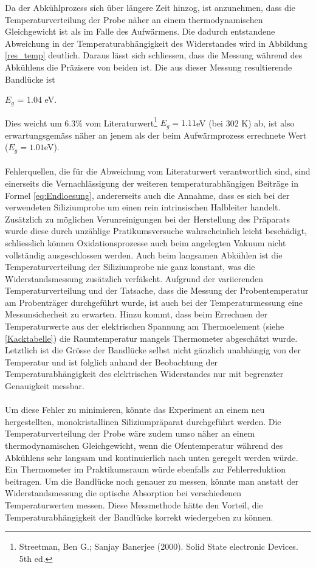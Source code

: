 \documentclass[a4paper,parskip,11pt, DIV12]{scrreprt}
\begin{document}
Da der Abkühlprozess sich über längere Zeit hinzog, ist anzunehmen, dass die Temperaturverteilung der Probe näher an einem thermodynamischen Gleichgewicht ist als im Falle des Aufwärmens. Die dadurch entstandene Abweichung in der Temperaturabhängigkeit des Widerstandes wird in Abbildung
\ref{res_temp} deutlich. Daraus lässt sich schliessen, dass die Messung während des Abkühlens die Präzisere von beiden ist. Die aus dieser Messung resultierende Bandlücke ist \begin{center}
$E_g$ = 1.04 eV.
\end{center} Dies weicht um 6.3\% vom Literaturwert\footnote{Streetman, Ben G.; Sanjay Banerjee (2000). Solid State electronic Devices. 5th ed.} $E_g = 1.11$eV (bei 302 K) ab, ist also erwartungsgemäss näher an jenem als der beim Aufwärmprozess errechnete Wert ($E_g = 1.01$eV). \\
\\
Fehlerquellen, die für die Abweichung vom Literaturwert verantwortlich sind, sind einerseits die Vernachlässigung der weiteren temperaturabhängigen Beiträge in Formel \ref{eq:Endloesung}, andererseits auch die Annahme, dass es sich bei der verwendeten Siliziumprobe um einen rein intrinsischen Halbleiter handelt. Zusätzlich zu möglichen Verunreinigungen bei der Herstellung des Präparats wurde diese durch unzählige Pratikumsversuche wahrscheinlich leicht beschädigt, schliesslich können Oxidationsprozesse auch beim angelegten Vakuum nicht vollständig ausgeschlossen werden. Auch beim langsamen Abkühlen ist die Temperaturverteilung der Siliziumprobe nie ganz konstant, was die Widerstandsmessung zusätzlich verfälscht. Aufgrund der variierenden Temperaturverteilung und der Tatsache, dass die Messung der Probentemperatur am Probenträger durchgeführt wurde, ist auch bei der Temperaturmessung eine Messunsicherheit zu erwarten. Hinzu kommt, dass beim Errechnen der Temperaturwerte aus der elektrischen Spannung am Thermoelement (siehe \ref{Kacktabelle}) die Raumtemperatur mangels Thermometer abgeschätzt wurde. Letztlich ist die Grösse der Bandlücke selbst nicht gänzlich unabhängig von der Temperatur und ist folglich anhand der Beobachtung der Temperaturabhängigkeit des elektrischen Widerstandes nur mit begrenzter Genauigkeit messbar. \\
\\
Um diese Fehler zu minimieren, könnte das Experiment an einem neu hergestellten, monokristallinen Siliziumpräparat durchgeführt werden. Die Temperaturverteilung der Probe wäre zudem umso näher an einem thermodynamischen Gleichgewicht, wenn die Ofentemperatur während des Abkühlens sehr langsam und kontinuierlich nach unten geregelt werden würde. Ein Thermometer im Praktikumsraum würde ebenfalls zur Fehlerreduktion beitragen. Um die Bandlücke noch genauer zu messen, könnte man anstatt der Widerstandsmessung die optische Absorption bei verschiedenen Temperaturwerten messen. Diese Messmethode hätte den Vorteil, die Temperaturabhängigkeit der Bandlücke korrekt wiedergeben zu können.
\end{document}
